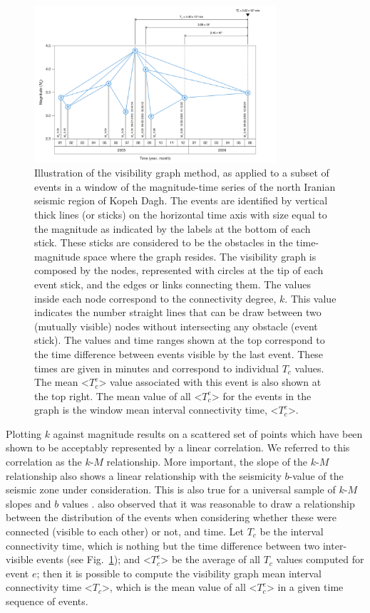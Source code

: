 \begin{figure}[t]
	\centering
	\includegraphics[width=0.8\textwidth]{figures/pdf/figure-01} 
	\caption{Illustration of the visibility graph method, as applied to a subset of events in a window of the magnitude-time series of the north Iranian seismic region of Kopeh Dagh. The events are identified by vertical thick lines (or sticks) on the horizontal time axis with size equal to the magnitude as indicated by the labels at the bottom of each stick. These sticks are considered to be the obstacles in the time-magnitude space where the graph resides. The visibility graph is composed by the nodes, represented with circles at the tip of each event stick, and the edges or links connecting them. The values inside each node correspond to the connectivity degree, $k$. This value indicates the number straight lines that can be draw between two (mutually visible) nodes without intersecting any obstacle (event stick). The values and time ranges shown at the top correspond to the time difference between events visible by the last event. These times are given in minutes and correspond to individual $T_c$ values. The mean <$T_c^e$> value associated with this event is also shown at the top right. The mean value of all <$T_c^e$> for the events in the graph is the window mean interval connectivity time, <$T_c^e$>.}
	\label{fig:vg}
\end{figure}

Plotting $k$ against magnitude results on a scattered set of points which have been shown to be acceptably represented by a linear correlation. We referred to this correlation as the $k$-$M$ relationship. More important, the slope of the $k$-$M$ relationship also shows a linear relationship with the seismicity $b$-value of the seismic zone under consideration. This is also true for a universal sample of $k$-$M$ slopes and $b$ values \citep{Telesca2013, Telesca2014}. \citet{Telesca2014} also observed that it was reasonable to draw a relationship between the distribution of the events when considering whether these were connected (visible to each other) or not, and time. Let $T_c$ be the interval connectivity time, which is nothing but the time difference between two inter-visible events (see Fig.~\ref{fig:vg}); and <$T_c^e$> be the average of all $T_c$ values computed for event $e$; then it is possible to compute the visibility graph mean interval connectivity time <$T_c$>, which is the mean value of all <$T_c^e$> in a given time sequence of events.

